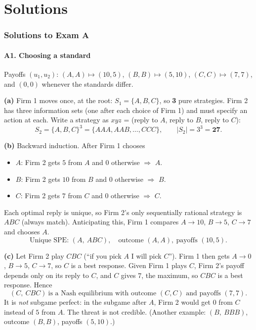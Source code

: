 \documentclass[11pt]{article}
\begin{document}
\part*{Solutions}

\section*{Solutions to Exam A}

\subsection*{A1. Choosing a standard}
Payoffs $(u_1,u_2)$: $(A,A)\mapsto(10,5)$, $(B,B)\mapsto(5,10)$, $(C,C)\mapsto(7,7)$, and $(0,0)$ whenever the standards differ.

\textbf{(a)} Firm 1 moves once, at the root: $S_1=\{A,B,C\}$, so \textbf{3} pure strategies.
Firm 2 has three information sets (one after each choice of Firm 1) and must specify an action at each. Write a strategy as $xyz$ = (reply to $A$, reply to $B$, reply to $C$):
\[
  S_2=\{A,B,C\}^3=\{AAA,AAB,\dots,CCC\},\qquad |S_2|=3^3=\textbf{27}.
\]

\textbf{(b)} Backward induction. After Firm 1 chooses
\begin{itemize}
  \item $A$: Firm 2 gets $5$ from $A$ and $0$ otherwise $\Rightarrow$ $A$.
  \item $B$: Firm 2 gets $10$ from $B$ and $0$ otherwise $\Rightarrow$ $B$.
  \item $C$: Firm 2 gets $7$ from $C$ and $0$ otherwise $\Rightarrow$ $C$.
\end{itemize}
Each optimal reply is unique, so Firm 2's only sequentially rational strategy is $ABC$ (always match). Anticipating this, Firm 1 compares $A\to10$, $B\to5$, $C\to7$ and chooses $A$.
\[
  \boxed{\text{Unique SPE: } (A,\ ABC),\quad \text{outcome } (A,A),\ \text{payoffs } (10,5).}
\]

\textbf{(c)} Let Firm 2 play $CBC$ (``if you pick $A$ I will pick $C$''). Firm 1 then gets $A\to0$, $B\to5$, $C\to7$, so $C$ is a best response. Given Firm 1 plays $C$, Firm 2's payoff depends only on its reply to $C$, and $C$ gives $7$, the maximum, so $CBC$ is a best response. Hence
\[
  (C,\ CBC)\ \text{is a Nash equilibrium with outcome } (C,C) \text{ and payoffs } (7,7).
\]
It is \emph{not} subgame perfect: in the subgame after $A$, Firm 2 would get $0$ from $C$ instead of $5$ from $A$. The threat is not credible.
(Another example: $(B,\ BBB)$, outcome $(B,B)$, payoffs $(5,10)$.)
\end{document}
